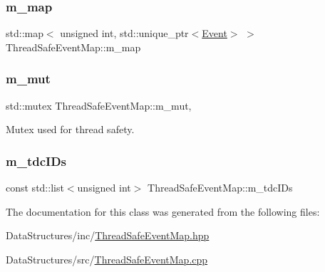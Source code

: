\subsubsection{\texorpdfstring{m\+\_\+map}{m\_map}}
{\footnotesize\ttfamily std\+::map$<$ unsigned int, std\+::unique\+\_\+ptr$<$\hyperlink{class_event}{Event}$>$ $>$ Thread\+Safe\+Event\+Map\+::m\+\_\+map\hspace{0.3cm}{\ttfamily [private]}}

\mbox{\label{class_thread_safe_event_map_ada4e8c2f2195df86503e73674ff30935}} 
\subsubsection{\texorpdfstring{m\+\_\+mut}{m\_mut}}
{\footnotesize\ttfamily std\+::mutex Thread\+Safe\+Event\+Map\+::m\+\_\+mut\hspace{0.3cm}{\ttfamily [mutable]}, {\ttfamily [private]}}



Mutex used for thread safety. 

\mbox{\label{class_thread_safe_event_map_ad079392d8a51bb1cc7835c52489fa6ca}} 
\subsubsection{\texorpdfstring{m\+\_\+tdc\+I\+Ds}{m\_tdcIDs}}
{\footnotesize\ttfamily const std\+::list$<$unsigned int$>$ Thread\+Safe\+Event\+Map\+::m\+\_\+tdc\+I\+Ds\hspace{0.3cm}{\ttfamily [private]}}



The documentation for this class was generated from the following files\+:\begin{DoxyCompactItemize}
\item 
Data\+Structures/inc/\hyperlink{_thread_safe_event_map_8hpp}{Thread\+Safe\+Event\+Map.\+hpp}\item 
Data\+Structures/src/\hyperlink{_thread_safe_event_map_8cpp}{Thread\+Safe\+Event\+Map.\+cpp}\end{DoxyCompactItemize}
